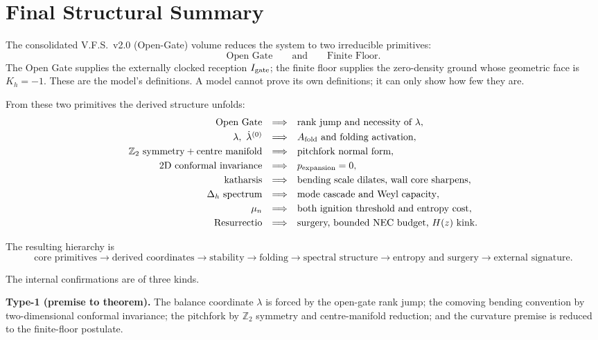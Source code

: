 \documentclass[11pt,a4paper,oneside]{book}
\theoremstyle{plain}
\theoremstyle{definition}
\theoremstyle{remark}
\begin{document}
\backmatter

\chapter*{Final Structural Summary}

The consolidated V.F.S.\ v2.0 (Open-Gate) volume reduces the system to two irreducible primitives:
\[
\boxed{\quad\text{Open Gate}\qquad\text{and}\qquad\text{Finite Floor}.\quad}
\]
The Open Gate supplies the externally clocked reception $I_{\rm gate}$; the finite floor supplies the
zero-density ground whose geometric face is $K_h=-1$. These are the model's definitions. A model cannot
prove its own definitions; it can only show how few they are.

From these two primitives the derived structure unfolds:
\[
\begin{array}{rcl}
\text{Open Gate} &\Longrightarrow& \text{rank jump and necessity of }\lambda,\\[1mm]
\lambda,\ \dot\lambda^{(0)} &\Longrightarrow& A_{\rm fold}\text{ and folding activation},\\[1mm]
\mathbb Z_2\text{ symmetry}+\text{centre manifold} &\Longrightarrow& \text{pitchfork normal form},\\[1mm]
\text{2D conformal invariance} &\Longrightarrow& p_{\rm expansion}=0,\\[1mm]
\text{katharsis} &\Longrightarrow& \text{bending scale dilates, wall core sharpens},\\[1mm]
\Delta_h\text{ spectrum} &\Longrightarrow& \text{mode cascade and Weyl capacity},\\[1mm]
\mu_n &\Longrightarrow& \text{both ignition threshold and entropy cost},\\[1mm]
\text{Resurrectio} &\Longrightarrow& \text{surgery, bounded NEC budget, }H(z)\text{ kink}.
\end{array}
\]

The resulting hierarchy is
\[
\boxed{\;\text{core primitives}\to\text{derived coordinates}\to\text{stability}\to\text{folding}
\to\text{spectral structure}\to\text{entropy and surgery}\to\text{external signature}.\;}
\]

The internal confirmations are of three kinds.

\textbf{Type-1 (premise to theorem).} The balance coordinate $\lambda$ is forced by the open-gate rank
jump; the comoving bending convention by two-dimensional conformal invariance; the pitchfork by
$\mathbb Z_2$ symmetry and centre-manifold reduction; and the curvature premise is reduced to the
finite-floor postulate.
\end{document}
